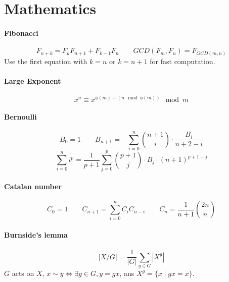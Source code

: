 \documentclass[a4paper,9pt]{article}
\begin{document}
	
	\tableofcontents
	
	\section{Mathematics}
	
	\paragraph{Fibonacci}
	$$ F_{n+k} = F_k F_{n+1} + F_{k-1} F_n \qquad GCD(F_m, F_n) = F_{GCD(m, n)} $$
	Use the first equation with $k=n$ or $k=n+1$ for fast computation.
	
	\paragraph{Large Exponent}
	$$ x^n \equiv x^{\phi(m) + \left( n \!\!\!\mod \phi(m) \right)} \mod m $$
	
	\paragraph{Bernoulli}
	$$ B_0 = 1 \qquad B_{n+1} = - \sum_{i = 0}^{n} \binom{n+1}{i} \cdot \frac{B_i}{n+2-i} $$
	$$ \sum_{i=0}^{n} i^p = \frac{1}{p+1} \sum_{j = 0}^p \binom{p+1}{j} \cdot B_j \cdot (n+1)^{p+1-j} $$
	
	\paragraph{Catalan number}
	$$ C_0 = 1 \qquad C_{n+1} = \sum_{i = 0}^n C_i C_{n-i} \qquad C_n = \frac{1}{n+1} \binom{2n}{n} $$

	\paragraph{Burnside's lemma}
	$$ \left| X / G \right| = \frac{1}{|G|} \sum_{g \in G} \left| X^g \right| $$
	$G$ acts on $X$, $x \sim y \Leftrightarrow \exists g \in G, y = gx$, ans $X^g = \{ x \mid gx = x \}$.
\end{document}
